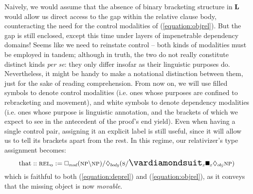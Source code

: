 Naively, we would assume that the absence of binary bracketing structure in $\textbf{L}$ would allow us direct access to the gap within the relative clause body, counteracting the need for the control modalities of (\ref{equation:objrel}).
But the gap is still enclosed, except this time under layers of impenetrable dependency domains!
Seems like we need to reinstate control -- both kinds of modalities must be employed in tandem;
although in truth, the two do not really constitute distinct kinds \textit{per se}: they only differ insofar as their linguistic purposes do.
Nevertheless, it might be handy to make a notational distinction between them, just for the sake of reading comprehension.
From now on, we will use filled symbols to denote control modalities (i.e. ones whose purposes are confined to rebracketing and movement), and white symbols to denote dependency modalities (i.e. ones whose purpose is linguistic annotation, and the brackets of which we expect to see in the antecedent of the proof's end yield).
Even when having a single control pair, assigning it an explicit label  is still useful, since it will allow us to tell its brackets apart from the rest.
In this regime, our relativizer's type assignment becomes:
\begin{equation}
\text{that} :: \subcat{l}{rel}{o} := \dbox{mod}(\np\divleft\np)\divright\ddia{body}(\s\divright\dxdia{x}\dxbox{x}\ddia{obj}\np)
\end{equation}
which is faithful to both (\ref{equation:deprel}) and (\ref{equation:objrel}), as it conveys that the missing object is now \textit{movable}.



